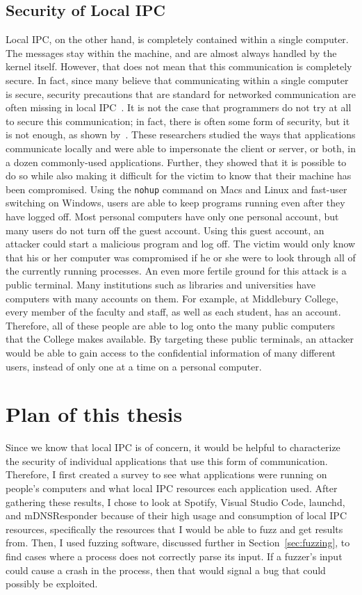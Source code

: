 \subsection{Security of Local IPC}
\label{sec:localIPCSecurity}
Local IPC, on the other hand, is completely contained within a single computer.  The messages stay within the machine, and are almost always handled by the kernel itself.  However, that does not mean that this communication is completely secure.  In fact, since many believe that communicating within a single computer is secure, security precautions that are standard for networked communication are often missing in local IPC~\cite{MitMa}.  It is not the case that programmers do not try at all to secure this communication; in fact, there is often some form of security, but it is not enough, as shown by~\cite{MitMa}.  These researchers studied the ways that applications communicate locally and were able to impersonate the client or server, or both, in a dozen commonly-used applications.  Further, they showed that it is possible to do so while also making it difficult for the victim to know that their machine has been compromised.  Using the \texttt{nohup} command on Macs and Linux and fast-user switching on Windows, users are able to keep programs running even after they have logged off.  Most personal computers have only one personal account, but many users do not turn off the guest account.  Using this guest account, an attacker could start a malicious program and log off.  The victim would only know that his or her computer was compromised if he or she were to look through all of the currently running processes.  An even more fertile ground for this attack is a public terminal.  Many institutions such as libraries and universities have computers with many accounts on them.  For example, at Middlebury College, every member of the faculty and staff, as well as each student, has an account.  Therefore, all of these people are able to log onto the many public computers that the College makes available.  By targeting these public terminals, an attacker would be able to gain access to the confidential information of many different users, instead of only one at a time on a personal computer.


\section{Plan of this thesis}
\label{sec:planOfThesis}
Since we know that local IPC is of concern, it would be helpful to characterize the security of individual applications that use this form of communication.  Therefore, I first created a survey to see what applications were running on people's computers and what local IPC resources each application used.  After gathering these results, I chose to look at Spotify, Visual Studio Code, launchd, and mDNSResponder because of their high usage and consumption of local IPC resources, specifically the resources that I would be able to fuzz and get results from.  Then, I used fuzzing software, discussed further in Section~\ref{sec:fuzzing}, to find cases where a process does not correctly parse its input.  If a fuzzer's input could cause a crash in the process, then that would signal a bug that could possibly be exploited.


